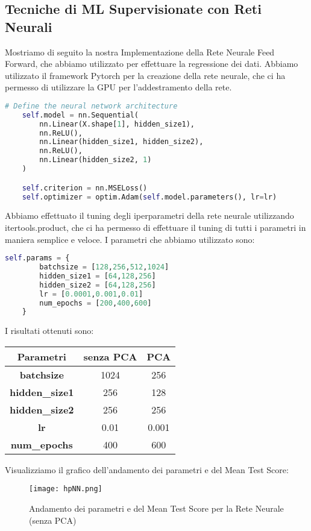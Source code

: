 \documentclass[../../Report.tex]{subfiles}
\begin{document}
\subsection{Tecniche di ML Supervisionate con Reti Neurali}
Mostriamo di seguito la nostra Implementazione della Rete Neurale Feed Forward, che abbiamo utilizzato per effettuare la regressione dei dati.
Abbiamo utilizzato il framework Pytorch per la creazione della rete neurale, che ci ha permesso di utilizzare la GPU per l'addestramento della rete.

\begin{lstlisting}[language=python]
    # Define the neural network architecture
    self.model = nn.Sequential(
        nn.Linear(X.shape[1], hidden_size1),
        nn.ReLU(),
        nn.Linear(hidden_size1, hidden_size2),
        nn.ReLU(),
        nn.Linear(hidden_size2, 1)
    )

    self.criterion = nn.MSELoss()
    self.optimizer = optim.Adam(self.model.parameters(), lr=lr)

\end{lstlisting}

Abbiamo effettuato il tuning degli iperparametri della rete neurale utilizzando itertools.product, che ci ha permesso di effettuare il tuning di tutti i parametri in maniera semplice e veloce.
I parametri che abbiamo utilizzato sono:
\begin{lstlisting}[language=python]
    self.params = {
        batchsize = [128,256,512,1024]	
        hidden_size1 = [64,128,256]
        hidden_size2 = [64,128,256]
        lr = [0.0001,0.001,0.01]
        num_epochs = [200,400,600]
    }
\end{lstlisting}
I risultati ottenuti sono:
\begin{table}[h]
    \centering
    \begin{tabular}{|c|c|c|}
    \hline
\textbf{Parametri} & \textbf{senza PCA} & \textbf{PCA} \\ \hline
\textbf{batchsize}& 1024 & 256\\
\textbf{hidden\_size1}& 256 &  128 \\
\textbf{hidden\_size2}& 256 & 256\\
\textbf{lr}& 0.01 &  0.001\\
\textbf{num\_epochs}& 400 & 600\\
\hline
\end{tabular}
\end{table}

Visualizziamo il grafico dell'andamento dei parametri e del Mean Test Score:
\begin{figure}[h]
    \centering
    \texttt{[image: hpNN.png]}
    \caption{Andamento dei parametri e del Mean Test Score per la Rete Neurale (senza PCA)}
\end{figure}
\end{document}
